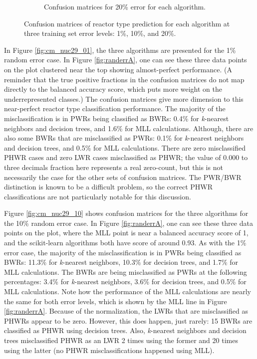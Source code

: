 \begin{figure}[!htb]
\begin{subfigure}[b]{\textwidth}
    \caption{Confusion matrices for 20\% error for each algorithm.}
    \label{fig:cm_nuc29_20}
  \end{subfigure}
  \caption{Confusion matrices of reactor type prediction for each algorithm 
           at three training set error levels: 1\%, 10\%, and 20\%.}
  \label{fig:cm_nuc29}
\end{figure}

In Figure \ref{fig:cm_nuc29_01}, the three algorithms are presented for the 1\%
random error case. In Figure \ref{fig:randerrA}, one can see these three data
points on the plot clustered near the top showing almost-perfect performance.
(A reminder that the true positive fractions in the confusion matrices do not
map directly to the balanced accuracy score, which puts more weight on the
underrepresented classes.) The confusion matrices give more dimension to this
near-perfect reactor type classification performance. The majority of the
misclassification is in \gls{PWR}s being classified as \gls{BWR}s: 0.4\% for
\textit{k}-nearest neighbors and decision trees, and 1.6\% for \gls{MLL}
calculations. Although, there are also some \gls{BWR}s that are misclassified
as \gls{PWR}s: 0.1\% for \textit{k}-nearest neighbors and decision trees, and
0.5\% for \gls{MLL} calculations.  There are zero misclassified \gls{PHWR}
cases and zero \gls{LWR} cases misclassified as \gls{PHWR}; the value of 0.000
to three decimals fraction here represents a real zero-count, but this is not
necessarily the case for the other sets of confusion matrices.  The
\gls{PWR}/\gls{BWR} distinction is known to be a difficult problem, so the correct \gls{PHWR} classifications are not particularly
notable for this discussion. 

Figure \ref{fig:cm_nuc29_10} shows confusion matrices for the three algorithms
for the 10\% random error case. In Figure \ref{fig:randerrA}, one can see these
three data points on the plot, where the \gls{MLL} point is near a balanced
accuracy score of 1, and the scikit-learn algorithms both have score of around
0.93. As with the 1\% error case, the majority of the misclassification is in
\gls{PWR}s being classified as \gls{BWR}s: 11.3\% for \textit{k}-nearest
neighbors, 10.3\% for decision trees, and 1.7\% for \gls{MLL} calculations.
The \gls{BWR}s are being misclassified as \gls{PWR}s at the following
percentages: 3.4\% for \textit{k}-nearest neighbors, 3.6\% for decision trees,
and 0.5\% for \gls{MLL} calculations. Note how the performance of the \gls{MLL}
calculations are nearly the same for both error levels, which is shown by the
\gls{MLL} line in Figure \ref{fig:randerrA}. Because of the normalization, the
\gls{LWR}s that are misclassified as \gls{PHWR}s appear to be zero. However,
this does happen, just rarely: 15 \gls{BWR}s are classified as \gls{PHWR} using
decision trees. Also, \textit{k}-nearest neighbors and decision trees
misclassified \gls{PHWR} as an \gls{LWR} 2 times using the former and 20 times
using the latter (no \gls{PHWR} misclassifications happened using \gls{MLL}).

